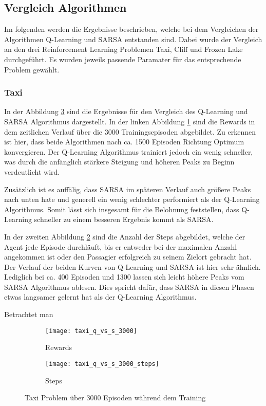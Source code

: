 \subsection{Vergleich Algorithmen}

Im folgenden werden die Ergebnisse beschrieben, welche bei dem Vergleichen der Algorithmen Q-Learning und SARSA entstanden sind.
Dabei wurde der Vergleich an den drei Reinforcement Learning Problemen Taxi, Cliff und Frozen Lake durchgeführt. Es wurden jeweils passende Paramater für das entsprechende Problem gewählt.
\subsubsection{Taxi}

In der Abbildung \ref{fig:taxi_train} sind die Ergebnisse für den Vergleich des Q-Learning und SARSA Algorithmus dargestellt. In der linken Abbildung \ref{fig:taxi_rew} sind die Rewards in dem zeitlichen Verlauf über die 3000 Trainingsepisoden abgebildet. Zu erkennen ist hier, dass beide Algorithmen nach ca. 1500 Episoden Richtung Optimum konvergieren. Der Q-Learning Algorithmus trainiert jedoch ein wenig schneller, was durch die anfänglich stärkere Steigung und höheren Peaks zu Beginn verdeutlicht wird.

Zusätzlich ist es auffälig, dass SARSA im späteren Verlauf auch größere Peaks nach unten hate und generell ein wenig schlechter performiert als der Q-Learning Algorithmus. Somit lässt sich insgesamt für die Belohnung feststellen, dass Q-Learning schneller zu einem besseren Ergebnis kommt als SARSA. 

In der zweiten Abbildung \ref{fig:taxi_step} sind die Anzahl der Steps abgebildet, welche der Agent jede Episode durchläuft, bis er entweder bei der maximalen Anzahl angekommen ist oder den Passagier erfolgreich zu seinem Zielort gebracht hat. Der Verlauf der beiden Kurven von Q-Learning und SARSA ist hier sehr ähnlich. Lediglich bei ca. 400 Episoden und 1300 lassen sich leicht höhere Peaks vom SARSA Algorithmus ablesen.
Dies spricht dafür, dass SARSA in diesen Phasen etwas langsamer gelernt hat als der Q-Learning Algorithmus.

Betrachtet man 

\begin{figure}[H]
    \centering
    \begin{subfigure}{.5\textwidth}
      \centering
      \texttt{[image: taxi\_q\_vs\_s\_3000]}
      \caption{Rewards}
      \label{fig:taxi_rew}
    \end{subfigure}%
    \begin{subfigure}{.5\textwidth}
      \centering
      \texttt{[image: taxi\_q\_vs\_s\_3000\_steps]}
      \caption{Steps}
      \label{fig:taxi_step}
    \end{subfigure}
    \caption{Taxi Problem über 3000 Episoden während dem Training}
    \label{fig:taxi_train}
\end{figure}

